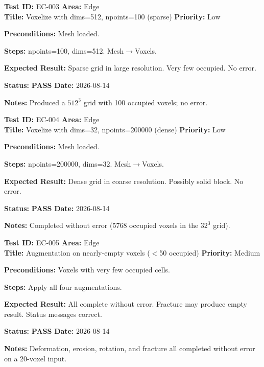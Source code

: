 \documentclass[12pt,a4paper]{article}
\newcommand{\pass}{\textcolor{paleogreen}{\textbf{PASS}}}
\newcommand{\testheader}[4]{%
  \smallskip
  \noindent\textbf{Test ID:} #1 \hfill \textbf{Area:} #2 \\
  \textbf{Title:} #3 \hfill \textbf{Priority:} #4
}
\newenvironment{testbody}{%
  \begin{description}[leftmargin=2em,style=nextline]
}{%
  \end{description}
  \smallskip
}
\begin{document}
\testheader{EC-003}{Edge}{Voxelize with dims=512, npoints=100 (sparse)}{Low}
\begin{testbody}
  \item[\textbf{Preconditions:}] Mesh loaded.
  \item[\textbf{Steps:}] npoints=100, dims=512. Mesh$\rightarrow$Voxels.
  \item[\textbf{Expected Result:}] Sparse grid in large resolution. Very few
        occupied. No error.
  \item[\textbf{Status:}] \pass{} \hspace{1em} \textbf{Date:} 2026-08-14
  \item[\textbf{Notes:}] Produced a $512^3$ grid with 100 occupied voxels; no
        error.
\end{testbody}

\testheader{EC-004}{Edge}{Voxelize with dims=32, npoints=200000 (dense)}{Low}
\begin{testbody}
  \item[\textbf{Preconditions:}] Mesh loaded.
  \item[\textbf{Steps:}] npoints=200000, dims=32. Mesh$\rightarrow$Voxels.
  \item[\textbf{Expected Result:}] Dense grid in coarse resolution. Possibly
        solid block. No error.
  \item[\textbf{Status:}] \pass{} \hspace{1em} \textbf{Date:} 2026-08-14
  \item[\textbf{Notes:}] Completed without error (5768 occupied voxels in the
        $32^3$ grid).
\end{testbody}

\testheader{EC-005}{Edge}{Augmentation on nearly-empty voxels ($<$50 occupied)}{Medium}
\begin{testbody}
  \item[\textbf{Preconditions:}] Voxels with very few occupied cells.
  \item[\textbf{Steps:}] Apply all four augmentations.
  \item[\textbf{Expected Result:}] All complete without error. Fracture may
        produce empty result. Status messages correct.
  \item[\textbf{Status:}] \pass{} \hspace{1em} \textbf{Date:} 2026-08-14
  \item[\textbf{Notes:}] Deformation, erosion, rotation, and fracture all
        completed without error on a 20-voxel input.
\end{testbody}
\end{document}
